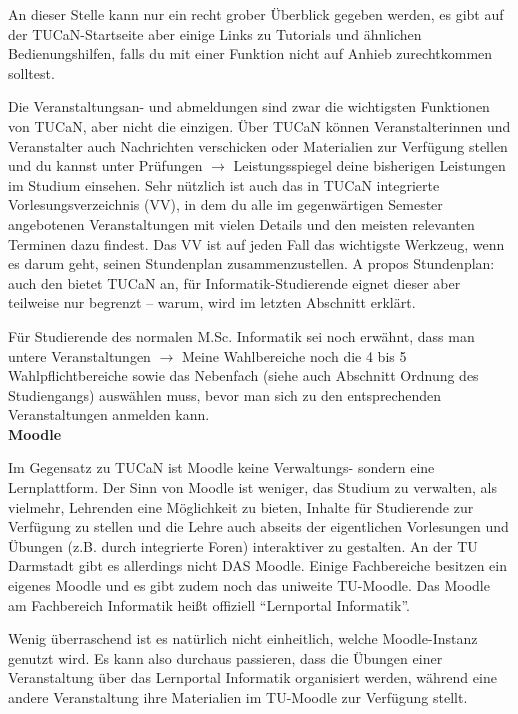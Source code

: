 {An dieser Stelle kann nur ein recht grober Überblick gegeben werden, es gibt auf der TUCaN-Startseite aber einige Links zu Tutorials und ähnlichen Bedienungshilfen, falls du mit einer Funktion nicht auf Anhieb zurechtkommen solltest.

Die Veranstaltungsan- und abmeldungen sind zwar die wichtigsten Funktionen von TUCaN, aber nicht die einzigen. Über TUCaN können Veranstalterinnen und Veranstalter auch Nachrichten verschicken oder Materialien zur Verfügung stellen und du kannst unter Prüfungen $\rightarrow$ Leistungsspiegel deine bisherigen Leistungen im Studium einsehen. Sehr nützlich ist auch das in TUCaN integrierte Vorlesungsverzeichnis (VV), in dem du alle im gegenwärtigen Semester angebotenen Veranstaltungen mit vielen Details und den meisten relevanten Terminen dazu findest. Das VV ist auf jeden Fall das wichtigste Werkzeug, wenn es darum geht, seinen Stundenplan zusammenzustellen. A propos Stundenplan: auch den bietet TUCaN an, für Informatik-Studierende eignet dieser aber teilweise nur begrenzt – warum, wird im letzten Abschnitt erklärt.

Für Studierende des normalen M.Sc. Informatik sei noch erwähnt, dass man untere Veranstaltungen $\rightarrow$ Meine Wahlbereiche noch die 4 bis 5 Wahlpflichtbereiche sowie das Nebenfach (siehe auch Abschnitt Ordnung des Studiengangs) auswählen muss, bevor man sich zu den entsprechenden Veranstaltungen anmelden kann.\\

\noindent\textbf{Moodle}

Im Gegensatz zu TUCaN ist Moodle keine Verwaltungs- sondern eine Lernplattform. Der Sinn von Moodle ist weniger, das Studium zu verwalten, als vielmehr, Lehrenden eine Möglichkeit zu bieten, Inhalte für Studierende zur Verfügung zu stellen und die Lehre auch abseits der eigentlichen Vorlesungen und Übungen (z.B. durch integrierte Foren) interaktiver zu gestalten. An der TU Darmstadt gibt es allerdings nicht DAS Moodle. Einige Fachbereiche besitzen ein eigenes Moodle und es gibt zudem noch das uniweite TU-Moodle. Das Moodle am Fachbereich Informatik \footnotemark[2] heißt offiziell "`Lernportal Informatik"'.

Wenig überraschend ist es natürlich nicht einheitlich, welche Moodle-Instanz genutzt wird. Es kann also durchaus passieren, dass die Übungen einer Veranstaltung über das Lernportal Informatik organisiert werden, während eine andere Veranstaltung ihre Materialien im TU-Moodle \footnotemark[3] zur Verfügung stellt.

}
